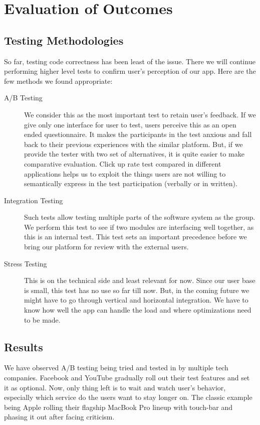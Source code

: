 %
%
\chapter{Evaluation of Outcomes}

\section{Testing Methodologies}

So far, testing code correctness has been least of the issue. There we will continue performing higher level tests to confirm user's perception of our app. Here are the few methods we found appropriate:

\begin{description}
	\item[A/B Testing] We consider this as the most important test to retain user's feedback. If we give only one interface for user to test, users perceive this as an open ended questionnaire. It makes the participants in the test anxious and fall back to their previous experiences with the similar platform. But, if we provide the tester with two set of alternatives, it is quite easier to make comparative evaluation. Click up rate test compared in different applications helps us to exploit the things users are not willing to semantically express in the test participation (verbally or in written).
	\item[Integration Testing] Such tests allow testing multiple parts of the software system as the group. We perform this test to see if two modules are interfacing well together, as this is an internal test. This test sets an important precedence before we bring our platform for review with the external users.
	\item[Stress Testing] This is on the technical side and least relevant for now. Since our user base is small, this test has no use so far till now. But, in the coming future we might have to go through vertical and horizontal integration. We have to know how well the app can handle the load and where optimizations need to be made.
\end{description}

\section{Results}

We have observed A/B testing being tried and tested in by multiple tech companies. Facebook and YouTube gradually roll out their test features and set it as optional. Now, only thing left is to wait and watch user's behavior, especially which service do the users want to stay longer on. The classic example being Apple rolling their flagship MacBook Pro lineup with touch-bar and phasing it out after facing criticism.

